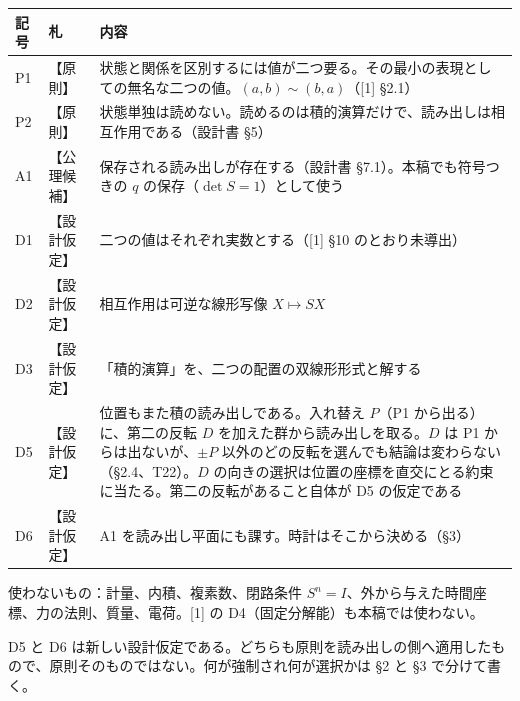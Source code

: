 \documentclass[
  a4paper,
]{ltjsarticle}
\newcounter{none} %
\begin{document}
{\def\LTcaptype{none} %
\begin{longtable}[]{@{}
  >{\raggedright\arraybackslash}p{}
  >{\raggedright\arraybackslash}p{}
  >{\raggedright\arraybackslash}p{}@{}}
\toprule\noalign{}
\begin{minipage}[b]{\linewidth}\raggedright
記号
\end{minipage} & \begin{minipage}[b]{\linewidth}\raggedright
札
\end{minipage} & \begin{minipage}[b]{\linewidth}\raggedright
内容
\end{minipage} \\
\midrule\noalign{}
\endhead
\bottomrule\noalign{}
\endlastfoot
P1 & 【原則】 &
状態と関係を区別するには値が二つ要る。その最小の表現としての無名な二つの値。\((a,b)\sim(b,a)\)（{[}1{]}
§2.1） \\
P2 & 【原則】 &
状態単独は読めない。読めるのは積的演算だけで、読み出しは相互作用である（設計書
§5） \\
A1 & 【公理候補】 & 保存される読み出しが存在する（設計書
§7.1）。本稿でも符号つきの \(q\) の保存（\(\det S=1\)）として使う \\
D1 & 【設計仮定】 & 二つの値はそれぞれ実数とする（{[}1{]} §10
のとおり未導出） \\
D2 & 【設計仮定】 & 相互作用は可逆な線形写像 \(X\mapsto SX\) \\
D3 & 【設計仮定】 & 「積的演算」を、二つの配置の双線形形式と解する \\
D5 & 【設計仮定】 & 位置もまた積の読み出しである。入れ替え \(P\)（P1
から出る）に、第二の反転 \(D\) を加えた群から読み出しを取る。\(D\) は P1
からは出ないが、\(\pm P\)
以外のどの反転を選んでも結論は変わらない（§2.4、T22）。\(D\)
の向きの選択は位置の座標を直交にとる約束に当たる。第二の反転があること自体が
D5 の仮定である \\
D6 & 【設計仮定】 & A1
を読み出し平面にも課す。時計はそこから決める（§3） \\
\end{longtable}
}

使わないもの：計量、内積、複素数、閉路条件
\(S^n=I\)、外から与えた時間座標、力の法則、質量、電荷。{[}1{]} の
D4（固定分解能）も本稿では使わない。

D5 と D6
は新しい設計仮定である。どちらも原則を読み出しの側へ適用したもので、原則そのものではない。何が強制され何が選択かは
§2 と §3 で分けて書く。
\end{document}

